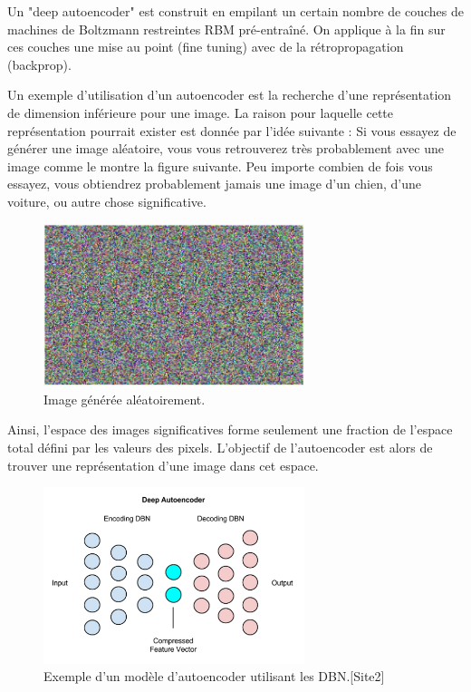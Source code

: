 
Un "deep autoencoder" est construit en empilant un certain nombre de couches de machines de Boltzmann restreintes RBM pré-entraîné. On applique à la fin sur ces couches une mise au point (fine tuning) avec de la rétropropagation (backprop).

Un exemple d'utilisation d'un autoencoder est la recherche d'une représentation de dimension inférieure pour une image. La raison pour laquelle cette représentation pourrait exister est donnée par l'idée suivante :
Si vous essayez de générer une image aléatoire, vous vous  retrouverez très probablement avec une image comme le montre la figure suivante. Peu importe combien de fois vous essayez, vous obtiendrez probablement jamais une image d'un chien, d'une voiture, ou autre chose significative.


\begin{figure}[H]
	\centering
		\includegraphics[width=3in]{Figures/randomImageGEn.JPG}
	\caption[An Electron]{Image générée aléatoirement.}
	\label{fig:Electron}
\end{figure}

Ainsi, l'espace des images significatives forme seulement une fraction de l'espace total défini par les valeurs des pixels. L'objectif de l'autoencoder est alors de trouver une représentation d'une image dans cet espace.


\begin{figure}[H]
	\centering
		\includegraphics[width=3in]{Figures/deep_autoencoder.png}
	\caption[An Electron]{Exemple d'un modèle d'autoencoder utilisant les DBN.[Site2]}
	\label{fig:Electron}
\end{figure}

